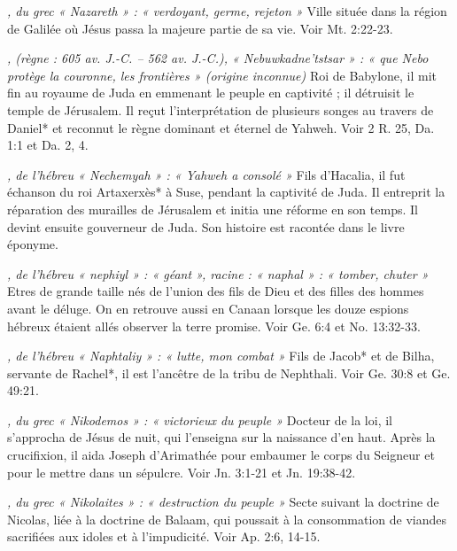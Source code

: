 \begin{multicols}{2}
\textit{, du grec « Nazareth » : « verdoyant, germe, rejeton »}\newline
Ville située dans la région de Galilée où Jésus passa la majeure partie de sa vie. Voir Mt. 2:22-23.

\textit{, (règne : 605 av. J.-C. – 562 av. J.-C.), « Nebuwkadne'tstsar » : « que Nebo protège la couronne, les frontières » (origine inconnue)}\newline
Roi de Babylone, il mit fin au royaume de Juda en emmenant le peuple en captivité ; il détruisit le temple de Jérusalem. Il reçut l'interprétation de plusieurs songes au travers de Daniel* et reconnut le règne dominant et éternel de Yahweh. Voir 2 R. 25, Da. 1:1 et Da. 2, 4.

\textit{, de l'hébreu « Nechemyah » : « Yahweh a consolé »}\newline
Fils d'Hacalia, il fut échanson du roi Artaxerxès* à Suse, pendant la captivité de Juda. Il entreprit la réparation des murailles de Jérusalem et initia une réforme en son temps. Il devint ensuite gouverneur de Juda. Son histoire est racontée dans le livre éponyme.

\textit{, de l'hébreu « nephiyl » : « géant », racine : « naphal » : « tomber, chuter »}\newline
Etres de grande taille nés de l'union des fils de Dieu et des filles des hommes avant le déluge. On en retrouve aussi en Canaan lorsque les douze espions hébreux étaient allés observer la terre promise. Voir Ge. 6:4 et No. 13:32-33.

\textit{, de l'hébreu « Naphtaliy » : « lutte, mon combat »}\newline
Fils de Jacob* et de Bilha, servante de Rachel*, il est l'ancêtre de la tribu de Nephthali. Voir Ge. 30:8 et Ge. 49:21.

\textit{, du grec « Nikodemos » : « victorieux du peuple »}\newline
Docteur de la loi, il s'approcha de Jésus de nuit, qui l'enseigna sur la naissance d'en haut. Après la crucifixion, il aida Joseph d'Arimathée pour embaumer le corps du Seigneur et pour le mettre dans un sépulcre. Voir Jn. 3:1-21 et Jn. 19:38-42.

\textit{, du grec « Nikolaites » : « destruction du peuple »}\newline
Secte suivant la doctrine de Nicolas, liée à la doctrine de Balaam, qui poussait à la consommation de viandes sacrifiées aux idoles et à l'impudicité. Voir Ap. 2:6, 14-15.


\end{multicols}
